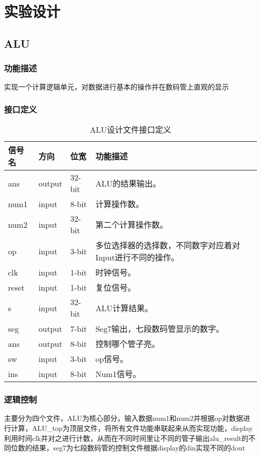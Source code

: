 \section{实验设计}
\subsection{ALU}\label{sub:alu}
\subsubsection{功能描述}
实现一个计算逻辑单元，对数据进行基本的操作并在数码管上直观的显示
\subsubsection{接口定义}
\begin{table}[htp]
	\caption{ALU设计文件接口定义}\label{tab:signaldef1}
	\begin{center}
		\begin{tabular}{|l|l|l|p{6cm}|}
		\hline
		\textbf{信号名} & \textbf{方向} & \textbf{位宽} & \textbf{功能描述}\\ \hline \hline
		ans		& output	& 32-bit	& ALU的结果输出。\\ \hline
		num1	& input		& 8-bit		& 计算操作数。\\ \hline
		num2	& input		& 32-bit	& 第二个计算操作数。\\ \hline
		op		& input		& 3-bit		& 多位选择器的选择数，不同数字对应着对Input进行不同的操作。\\ \hline
		clk		& input		& 1-bit		& 时钟信号。\\ \hline
		reset	& input		& 1-bit		& 复位信号。\\ \hline
		s		& input		& 32-bit	& ALU计算结果。\\ \hline
		seg		& output	& 7-bit		& Seg7输出，七段数码管显示的数字。\\ \hline
		ans		& output	& 8-bit		& 控制哪个管子亮。\\ \hline
		sw		& input		& 3-bit		& op信号。\\ \hline
		ins		& input		& 8-bit		& Num1信号。\\ \hline
		\end{tabular}
	\end{center}
\end{table}		

\subsubsection{逻辑控制}
主要分为四个文件，ALU为核心部分，输入数据num1和num2并根据op对数据进行计算，ALU\_top为顶层文件，将所有文件功能串联起来从而实现功能，display利用时间clk并对之进行计数，从而在不同时间里让不同的管子输出alu\_result的不同位数的结果，seg7为七段数码管的控制文件根据display的din实现不同的dout
